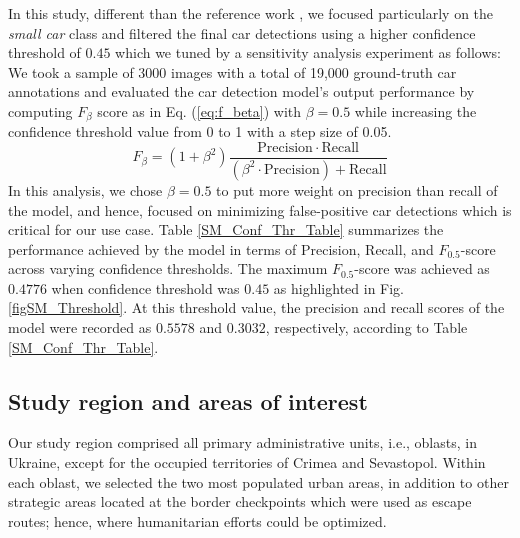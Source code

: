 \documentclass[sn-basic]{sn-jnl}%
\begin{document}
In this study, different than the reference work \citep{Minetto_et_al_2020}, we focused particularly on the \emph{small car} class and filtered the final car detections using a higher confidence threshold of $0.45$ which we tuned by a sensitivity analysis experiment as follows: We took a sample of 3000 images with a total of 19,000 ground-truth car annotations and evaluated the car detection model's output performance by computing $F_{\beta}$ score as in Eq. (\ref{eq:f_beta}) with $\beta=0.5$ while increasing the confidence threshold value from 0 to 1 with a step size of 0.05.
\begin{equation}
    F_{\beta} = (1+{\beta}^2)\frac{\mathrm{Precision}\cdot\mathrm{Recall}}{({\beta}^2\cdot\mathrm{Precision})+\mathrm{Recall}}
    \label{eq:f_beta}
\end{equation}
In this analysis, we chose $\beta=0.5$ to put more weight on precision than recall of the model, and hence, focused on minimizing false-positive car detections which is critical for our use case. Table \ref{SM_Conf_Thr_Table} summarizes the performance achieved by the model in terms of Precision, Recall, and $F_{0.5}$-score across varying confidence thresholds. The maximum $F_{0.5}$-score was achieved as $0.4776$ when confidence threshold was $0.45$ as highlighted in Fig. \ref{figSM_Threshold}. At this threshold value, the precision and recall scores of the model were recorded as $0.5578$ and $0.3032$, respectively, according to Table \ref{SM_Conf_Thr_Table}.




\subsection{Study region and areas of interest}\label{MMS2}

Our study region comprised all primary administrative units, i.e., oblasts, in Ukraine, except for the occupied territories of Crimea and Sevastopol. Within each oblast, we selected the two most populated urban areas, in addition to other strategic areas located at the border checkpoints which were used as escape routes; hence, where humanitarian efforts could be optimized.
\end{document}

